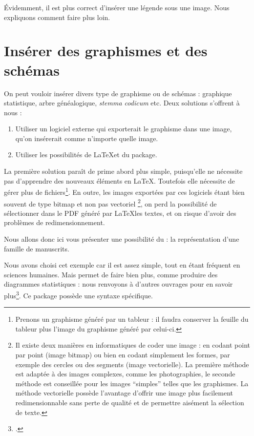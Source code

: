 \begin{attention}
	Évidemment, il est plus correct d'insérer une légende sous une image. Nous expliquons comment faire plus loin.
\end{attention}

\section{Insérer des graphismes et des schémas}

On peut vouloir insérer divers type de graphisme ou de schémas : graphique statistique, arbre généalogique, \emph{stemma codicum} etc.
Deux solutions s'offrent à nous :
\begin{enumerate}
\item Utiliser un logiciel externe qui exporterait le graphisme dans une image, qu'on insérerait comme n'importe quelle image.
\item Utiliser les possibilités de \LaTeX et du package.\label{TikZ}
\end{enumerate}

La première solution paraît de prime abord plus simple, puisqu'elle ne nécessite pas d'apprendre des nouveaux éléments en \LaTeX. Toutefois elle nécessite de gérer plus de fichiers\footnote{Prenons un graphisme généré par un tableur : il faudra conserver la feuille du tableur plus l'image du graphisme généré par celui-ci.}. En outre, les images exportées par ces logiciels étant bien souvent de type bitmap et non pas vectoriel%
\footnote{Il existe deux manières en informatiques de coder une image : en codant point par point (image bitmap) ou bien en codant simplement les formes, par exemple des cercles ou des segments (image vectorielle). La première méthode est adaptée à des images complexes, comme les photographies,  le seconde méthode est conseillée pour les images \enquote{simples} telles que les graphismes. La méthode vectorielle possède l'avantage d'offrir une image plus facilement redimensionnable  sans perte de qualité et de permettre aisément la sélection de texte.},
on perd la possibilité de sélectionner dans le PDF généré par \LaTeX les textes, et on risque d'avoir des problèmes de redimensionnement.

Nous allons donc ici vous présenter une possibilité du  : la représentation d'une famille de manuscrits. 

Nous avons choisi cet exemple car il est assez simple, tout en étant fréquent en sciences humaines. Mais  permet de faire bien plus, comme produire des diagrammes statistiques : nous renvoyons à d'autres ouvrages pour en savoir plus\footcites[Outre le manuel][]{tikz}[on pourra lire][]{tikzimpatient}[on pourra également consulter le site ][]{tikzexample}.
Ce package possède une syntaxe spécifique. 

